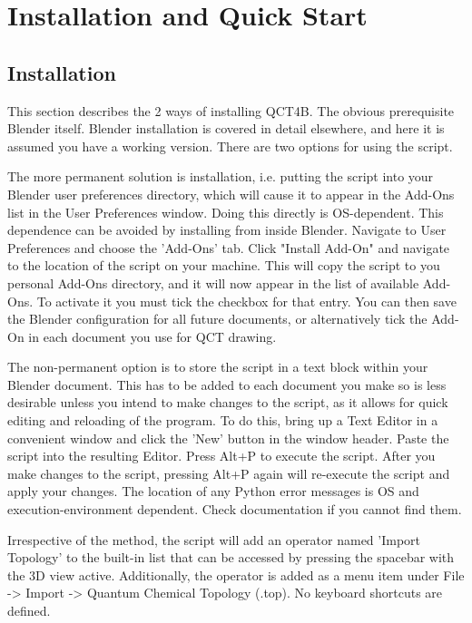 \documentclass{report}
\begin{document}
\chapter{Installation and Quick Start}

\section{Installation}

This section describes the 2 ways of installing QCT4B. The obvious prerequisite Blender itself. Blender installation is covered in detail elsewhere, and here it is assumed you have a working version.
There are two options for using the script.

The more permanent solution is installation, i.e. putting the script into your Blender user preferences directory, which will cause it to appear in the Add-Ons list in the User Preferences window.
Doing this directly is OS-dependent.
This dependence can be avoided by installing from inside Blender.
Navigate to User Preferences and choose the 'Add-Ons' tab.
Click "Install Add-On" and navigate to the location of the script on your machine.
This will copy the script to you personal Add-Ons directory, and it will now appear in the list of available Add-Ons.
To activate it you must tick the checkbox for that entry. 
You can then save the Blender configuration for all future documents, or alternatively tick the Add-On in each document you use for QCT drawing.

The non-permanent option is to store the script in a text block within your Blender document. 
This has to be added to each document you make so is less desirable unless you intend to make changes to the script, as it allows for quick editing and reloading of the program.
To do this, bring up a Text Editor in a convenient window and click the 'New' button in the window header.
Paste the script into the resulting Editor.
Press Alt+P to execute the script. 
After you make changes to the script, pressing Alt+P again will re-execute the script and apply your changes. 
The location of any Python error messages is OS and execution-environment dependent.
Check documentation if you cannot find them.

Irrespective of the method, the script will add an operator named 'Import Topology' to the built-in list that can be accessed by pressing the spacebar with the 3D view active.
Additionally, the operator is added as a menu item under File -> Import -> Quantum Chemical Topology (.top).
No keyboard shortcuts are defined.
\end{document}

